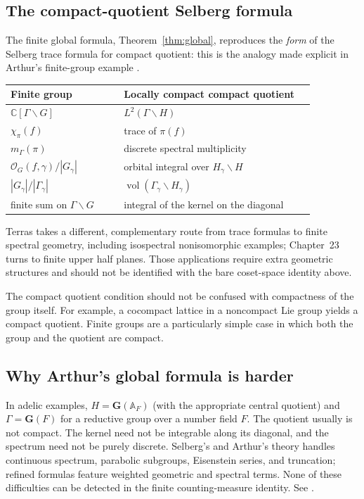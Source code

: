 \documentclass[12pt]{article}
\theoremstyle{remark}
\newcommand{\C}{\mathbb C}
\newcommand{\A}{\mathbb A}
\newcommand{\Orb}{\mathcal O}
\begin{document}
\subsection{The compact-quotient Selberg formula}
The finite global formula, Theorem~\ref{thm:global}, reproduces the
\emph{form} of the Selberg trace formula for compact quotient:
this is the analogy made explicit in Arthur's finite-group example
\cite[Example~2]{ArthurHecke1989}.
\begin{center}
\begin{tabular}{@{}p{0.32\linewidth}p{0.54\linewidth}@{}}
\toprule
Finite group & Locally compact compact quotient\\
\midrule
$\C[\Gamma\backslash G]$ & $L^2(\Gamma\backslash H)$\\
$\chi_\pi(f)$ & trace of $\pi(f)$\\
$m_\Gamma(\pi)$ & discrete spectral multiplicity\\
$\Orb_G(f,\gamma)/|G_\gamma|$ & orbital integral over $H_\gamma\backslash H$\\
$|G_\gamma|/|\Gamma_\gamma|$ & $\operatorname{vol}(\Gamma_\gamma\backslash H_\gamma)$\\
finite sum on $\Gamma\backslash G$ & integral of the kernel on the diagonal\\
\bottomrule
\end{tabular}
\end{center}
Terras \cite[Ch.~22]{Terras1999} takes a different, complementary
route from trace formulas to finite spectral geometry, including
isospectral nonisomorphic examples; Chapter~23 turns to finite
upper half planes. Those applications require extra geometric
structures and should not be identified with the bare coset-space
identity above.

The compact quotient condition should not be confused with
compactness of the group itself.  For example, a cocompact lattice
in a noncompact Lie group yields a compact quotient.  Finite groups
are a particularly simple case in which both the group and the
quotient are compact.

\subsection{Why Arthur's global formula is harder}
In adelic examples, $H=\mathbf G(\A_F)$ (with the appropriate
central quotient) and $\Gamma=\mathbf G(F)$ for a reductive group
over a number field $F$. The quotient usually is not compact.
The kernel need not be integrable along its diagonal, and the spectrum
need not be purely discrete.  Selberg's and Arthur's theory handles
continuous spectrum, parabolic subgroups, Eisenstein series, and
truncation; refined formulas feature weighted geometric and spectral
terms. None of these difficulties can be detected in the finite
counting-measure identity. See
\cite{Gelbart1996,ArthurIntro2005,Arthur1978,Arthur1980}.
\end{document}
